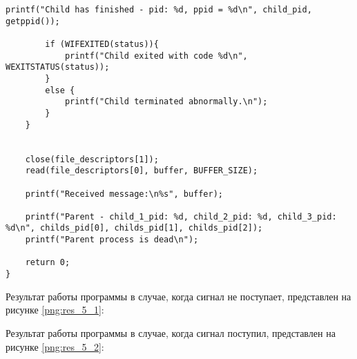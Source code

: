 \begin{lstlisting}[label = exec, caption=Использование сигнала.]
		printf("Child has finished - pid: %d, ppid = %d\n", child_pid, getppid());
		
		if (WIFEXITED(status)){
			printf("Child exited with code %d\n", WEXITSTATUS(status));
		}
		else {
			printf("Child terminated abnormally.\n");
		}
	}
	
	
	close(file_descriptors[1]);
	read(file_descriptors[0], buffer, BUFFER_SIZE);
	
	printf("Received message:\n%s", buffer);
	
	printf("Parent - child_1_pid: %d, child_2_pid: %d, child_3_pid: %d\n", childs_pid[0], childs_pid[1], childs_pid[2]);
	printf("Parent process is dead\n");
	
	return 0;
}

\end{lstlisting}


Результат работы программы в случае, когда сигнал не поступает, представлен на рисунке \ref{png:res_5_1}:

\begin{figure}[H]
\end{figure}

Результат работы программы в случае, когда сигнал поступил, представлен на рисунке \ref{png:res_5_2}:

\begin{figure}[H]
\end{figure}